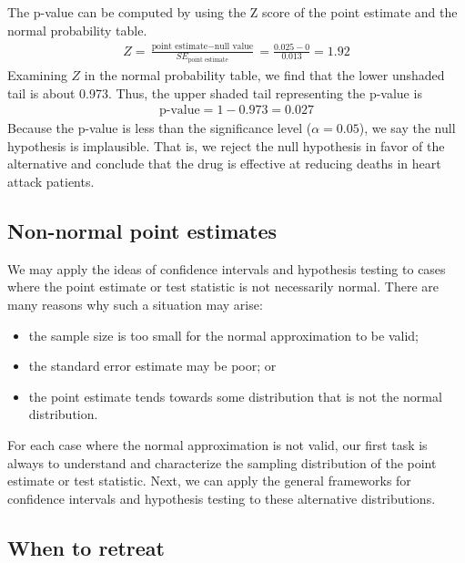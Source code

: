 \begin{example}
The p-value can be computed by using the Z score of the point estimate and the normal probability table.
\begin{eqnarray}
Z = \frac{\text{point estimate} - \text{null value}}{SE_{\text{point estimate}}}
	= \frac{0.025 - 0}{0.013} = 1.92
\label{zScoreOfPointEstimateForSulphinpyrazoneThisIsFirstTestStatReference}
\end{eqnarray}
Examining $Z$ in the normal probability table, we find that the lower unshaded tail is about 0.973. Thus, the upper shaded tail representing the p-value is
\begin{eqnarray*}
\text{p-value} = 1-0.973 = 0.027
\end{eqnarray*}
Because the p-value is less than the significance level ($\alpha=0.05$), we say the null hypothesis is implausible. That is, we reject the null hypothesis in favor of the alternative and conclude that the drug is effective at reducing deaths in heart attack patients.
\end{example}

\subsection{Non-normal point estimates}

We may apply the ideas of confidence intervals and hypothesis testing to cases where the point estimate or test statistic is not necessarily normal. There are many reasons why such a situation may arise:
\begin{itemize}
\setlength{\itemsep}{0mm}
\item the sample size is too small for the normal approximation to be valid;
\item the standard error estimate may be poor; or
\item the point estimate tends towards some distribution that is not the normal distribution.
\end{itemize}
For each case where the normal approximation is not valid, our first task is always to understand and characterize the sampling distribution of the point estimate or test statistic. Next, we can apply the general frameworks for confidence intervals and hypothesis testing to these alternative distributions.


\subsection{When to retreat}
\label{whenToRetreat}

